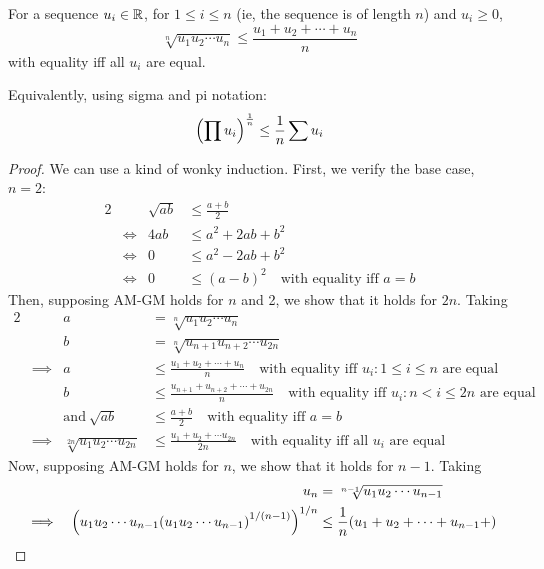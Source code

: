 \begin{theorem}[AM-GM inequality]
For a sequence \(u_i \in \mathbb R\), for \(1 \le i \le n\) (ie, the
sequence is of length \(n\)) and \(u_i \ge 0\),
\begin{equation*}
\sqrt[n]{u_1 u_2 \dotsm u_n} \le \frac{u_1 + u_2 + \dotsb + u_n}{n}
\end{equation*}
with equality iff all \(u_i\) are equal.

Equivalently, using sigma and pi notation:
\begin{equation*}
\pqty{\prod u_i}^\frac{1}{n} \le \frac{1}{n}\sum u_i
\end{equation*}
\end{theorem}
\begin{proof}
We can use a kind of wonky induction. First, we verify the base
case, \(n = 2\):
\begin{alignat*}{2}
&&\sqrt{ab} &\le \frac{a + b}{2} \\
&\iff& 4ab &\le a^2 + 2ab + b^2 \\
&\iff& 0 &\le a^2 - 2ab + b^2 \\
&\iff& 0 &\le (a - b)^2\quad \text{with equality iff \(a = b\)}
\end{alignat*}
Then, supposing AM-GM holds for \(n\) and 2, we show that it holds for
\(2n\).  Taking
\begin{alignat*}{2}
&&a &= \sqrt[n]{u_1 u_2 \dotsm u_n} \\
&&b &= \sqrt[n]{u_{n+1} u_{n+2} \dotsm u_{2n}} \\
&\implies& a &\le \frac{u_1 + u_2 + \dotsb + u_n}{n}
        \quad \text{with equality iff \(u_i: 1 \le i \le n\) are equal}\\
&&b &\le \frac{u_{n + 1} + u_{n + 2} + \dotsb + u_{2n}}{n}
        \quad \text{with equality iff \(u_i: n < i \le 2n\) are equal}\\
&&\text{and}\ \sqrt{ab} &\le \frac{a + b}{2}
    \quad \text{with equality iff \(a = b\)}\\
&\implies& \sqrt[2n]{u_1 u_2 \dotsm u_{2n}} &\le
         \frac{u_1 + u_2 + \dotsb u_{2n}}{2n}
            \quad \text{with equality iff all \(u_i\) are equal}
\end{alignat*}
Now, supposing AM-GM holds for \(n\), we show that it holds for \(n - 1\).
Taking
\begin{alignat*}{2}
&&u_n &= \sqrt[n - 1]{u_1 u_2 \dotsm u_{n - 1}} \\
&\implies& \pqty{u_1 u_2 \dotsm u_{n - 1}
            \pqty{u_1 u_2 \dotsm u_{n - 1}}^{1 / (n - 1)}}^{1 / n}
         &\le \frac 1n \pqty{u_1 + u_2 + \dotsb  + u_{n - 1} +
}
\end{alignat*}
\end{proof}
